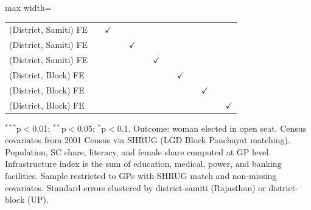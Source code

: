 \begin{adjustbox}{max width=\linewidth}
\begin{threeparttable}[b]
\begin{tabular}{lcccccccccccc}
          \\
         (District, Samiti) FE &              & $\checkmark$  &              &               &              &               &               &               &               &               &               & \\  
         (District, Samiti) FE &              &               &              & $\checkmark$  &              &               &               &               &               &               &               & \\  
         (District, Samiti) FE &              &               &              &               &              & $\checkmark$  &               &               &               &               &               & \\  
         (District, Block) FE  &              &               &              &               &              &               &               & $\checkmark$  &               &               &               & \\  
         (District, Block) FE  &              &               &              &               &              &               &               &               &               & $\checkmark$  &               & \\  
         (District, Block) FE  &              &               &              &               &              &               &               &               &               &               &               & $\checkmark$\\   
         \bottomrule
      \end{tabular}
      
      \begin{tablenotes}
         \item $^{***}$p$<$0.01; $^{**}$p$<$0.05; $^{*}$p$<$0.1. Outcome: woman elected in open seat. Census covariates from 2001 Census via SHRUG (LGD Block Panchayat matching). Population, SC share, literacy, and female share computed at GP level. Infrastructure index is the sum of education, medical, power, and banking facilities. Sample restricted to GPs with SHRUG match and non-missing covariates. Standard errors clustered by district-samiti (Rajasthan) or district-block (UP).
      \end{tablenotes}
   \end{threeparttable}
\end{adjustbox}
\par\endgroup


